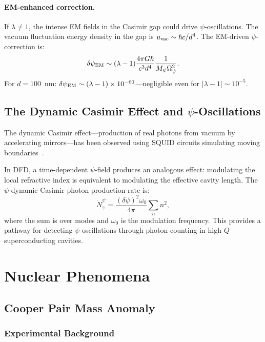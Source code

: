 \documentclass[aps,prb,twocolumn,superscriptaddress,floatfix,nofootinbib,longbibliography]{revtex4-2}
\newcommand{\Opsi}{\Omega_\psi}
\newcommand{\Mpsi}{M_\psi}
\begin{document}
\paragraph{EM-enhanced correction.}  If $\lambda \neq 1$, the intense
EM fields in the Casimir gap could drive $\psi$-oscillations.  The
vacuum fluctuation energy density in the gap is
$u_{\rm vac} \sim \hbar c/d^4$.  The EM-driven $\psi$-correction is:
\begin{equation}
\delta\psi_{\rm EM} \sim (\lambda - 1)\frac{4\pi G\hbar}{c^3 d^4}
\frac{1}{\Mpsi\Opsi^2}.
\label{eq:casimir-em}
\end{equation}
For $d = 100$~nm:
$\delta\psi_{\rm EM} \sim (\lambda - 1) \times 10^{-60}$---negligible
even for $|\lambda - 1| \sim 10^{-5}$.

\subsection{The Dynamic Casimir Effect and $\psi$-Oscillations}

The dynamic Casimir effect---production of real photons from vacuum by
accelerating mirrors---has been observed using SQUID circuits simulating
moving boundaries~\cite{Wilson2011}.

In DFD, a time-dependent $\psi$-field produces an analogous effect:
modulating the local refractive index is equivalent to modulating the
effective cavity length.  The $\psi$-dynamic Casimir photon production
rate is:
\begin{equation}
\dot{N}_\gamma^\psi = \frac{(\delta\psi)^2\omega_0}{4\pi}
\sum_n n^2,
\label{eq:dce-psi}
\end{equation}
where the sum is over modes and $\omega_0$ is the modulation frequency.
This provides a pathway for detecting $\psi$-oscillations through photon
counting in high-$Q$ superconducting cavities.

\section{Nuclear Phenomena}\label{sec:nuclear}

\subsection{Cooper Pair Mass Anomaly}

\subsubsection{Experimental Background}
\end{document}
